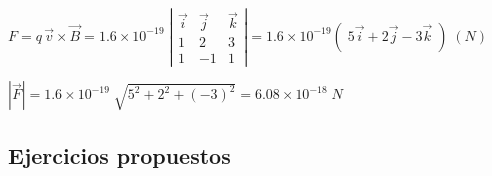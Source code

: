 \begin{proofw}\renewcommand{\qedsymbol}{$\diamond$}
	$F=q\, \vec v \times \vec B=1.6 \times 10^{-19}\; \left| \begin{matrix} \vec i & \vec j & \vec k \\ 1&2&3 \\ 1&-1&1 \end{matrix} \right|= 1.6 \times 10^{-19} (\;5  \vec i + 2 \vec j - 3 \vec k \; )\; (N)$
	
\noindent $|\vec F|= 1.6 \times 10^{-19} \; \sqrt{5^2+2^2+(-3)^2}=6.08 \times 10^{-18}\; N$
\end{proofw}





\subsection{Ejercicios propuestos}

